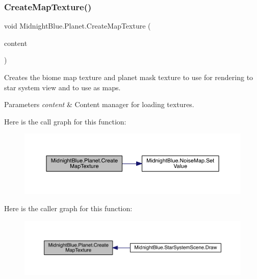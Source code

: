 \subsubsection{\texorpdfstring{Create\+Map\+Texture()}{CreateMapTexture()}}
{\footnotesize\ttfamily void Midnight\+Blue.\+Planet.\+Create\+Map\+Texture (\begin{DoxyParamCaption}\item[{Content\+Manager}]{content }\end{DoxyParamCaption})\hspace{0.3cm}{\ttfamily [inline]}}



Creates the biome map texture and planet mask texture to use for rendering to star system view and to use as maps. 


\begin{DoxyParams}{Parameters}
{\em content} & Content manager for loading textures.\\
\hline
\end{DoxyParams}
Here is the call graph for this function\+:
\nopagebreak
\begin{figure}[H]
\begin{center}
\leavevmode
\includegraphics[width=350pt]{class_midnight_blue_1_1_planet_ae39b013905369f01902b4f28d4fc031e_cgraph}
\end{center}
\end{figure}
Here is the caller graph for this function\+:
\nopagebreak
\begin{figure}[H]
\begin{center}
\leavevmode
\includegraphics[width=350pt]{class_midnight_blue_1_1_planet_ae39b013905369f01902b4f28d4fc031e_icgraph}
\end{center}
\end{figure}
\hypertarget{class_midnight_blue_1_1_planet_ac7264aea3a992afb4cab0ad99c96dbb8}{}\label{class_midnight_blue_1_1_planet_ac7264aea3a992afb4cab0ad99c96dbb8} 
